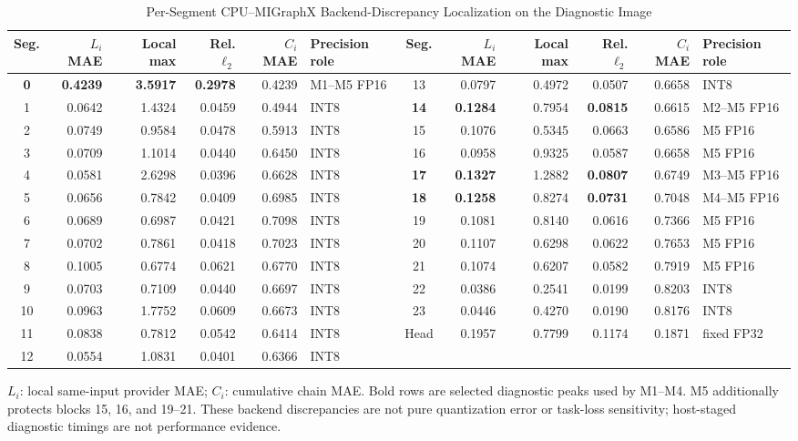 \documentclass[conference]{IEEEtran}
\begin{document}
\begin{table}[t]
\caption{Per-Segment CPU--MIGraphX Backend-Discrepancy Localization on the Diagnostic Image}
\label{tab:localization}
\centering
\scriptsize
\begin{tabular}{crrrrl@{\qquad}crrrrl}
\toprule
Seg. & $L_i$ MAE & Local max & Rel. $\ell_2$ & $C_i$ MAE & Precision role & Seg. & $L_i$ MAE & Local max & Rel. $\ell_2$ & $C_i$ MAE & Precision role \\
\midrule
\textbf{0} & \textbf{0.4239} & \textbf{3.5917} & \textbf{0.2978} & 0.4239 & M1--M5 FP16 & 13 & 0.0797 & 0.4972 & 0.0507 & 0.6658 & INT8 \\
1 & 0.0642 & 1.4324 & 0.0459 & 0.4944 & INT8 & \textbf{14} & \textbf{0.1284} & 0.7954 & \textbf{0.0815} & 0.6615 & M2--M5 FP16 \\
2 & 0.0749 & 0.9584 & 0.0478 & 0.5913 & INT8 & 15 & 0.1076 & 0.5345 & 0.0663 & 0.6586 & M5 FP16 \\
3 & 0.0709 & 1.1014 & 0.0440 & 0.6450 & INT8 & 16 & 0.0958 & 0.9325 & 0.0587 & 0.6658 & M5 FP16 \\
4 & 0.0581 & 2.6298 & 0.0396 & 0.6628 & INT8 & \textbf{17} & \textbf{0.1327} & 1.2882 & \textbf{0.0807} & 0.6749 & M3--M5 FP16 \\
5 & 0.0656 & 0.7842 & 0.0409 & 0.6985 & INT8 & \textbf{18} & \textbf{0.1258} & 0.8274 & \textbf{0.0731} & 0.7048 & M4--M5 FP16 \\
6 & 0.0689 & 0.6987 & 0.0421 & 0.7098 & INT8 & 19 & 0.1081 & 0.8140 & 0.0616 & 0.7366 & M5 FP16 \\
7 & 0.0702 & 0.7861 & 0.0418 & 0.7023 & INT8 & 20 & 0.1107 & 0.6298 & 0.0622 & 0.7653 & M5 FP16 \\
8 & 0.1005 & 0.6774 & 0.0621 & 0.6770 & INT8 & 21 & 0.1074 & 0.6207 & 0.0582 & 0.7919 & M5 FP16 \\
9 & 0.0703 & 0.7109 & 0.0440 & 0.6697 & INT8 & 22 & 0.0386 & 0.2541 & 0.0199 & 0.8203 & INT8 \\
10 & 0.0963 & 1.7752 & 0.0609 & 0.6673 & INT8 & 23 & 0.0446 & 0.4270 & 0.0190 & 0.8176 & INT8 \\
11 & 0.0838 & 0.7812 & 0.0542 & 0.6414 & INT8 & Head & 0.1957 & 0.7799 & 0.1174 & 0.1871 & fixed FP32 \\
12 & 0.0554 & 1.0831 & 0.0401 & 0.6366 & INT8 & & & & & & \\
\bottomrule
\end{tabular}
\vspace{2pt}
\parbox{0.96\textwidth}{\scriptsize $L_i$: local same-input provider MAE; $C_i$: cumulative chain MAE. Bold rows are selected diagnostic peaks used by M1--M4. M5 additionally protects blocks 15, 16, and 19--21. These backend discrepancies are not pure quantization error or task-loss sensitivity; host-staged diagnostic timings are not performance evidence.}
\end{table}
\end{document}
